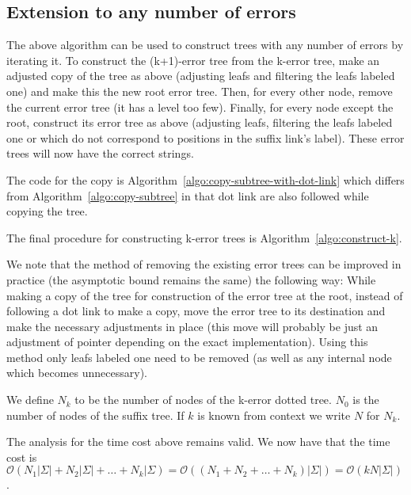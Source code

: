 \subsection{Extension to any number of errors}\label{subsec:construct-k-larger-1}

The above algorithm can be used to construct trees with any number of errors by iterating it. To construct the (k+1)-error tree from the k-error tree, make an adjusted copy of the tree as above (adjusting leafs and filtering the leafs labeled one) and make this the new root error tree. Then, for every other node, remove the current error tree (it has a level too few). Finally, for every node except the root, construct its error tree as above (adjusting leafs, filtering the leafs labeled one or which do not correspond to positions in the suffix link's label). These error trees will now have the correct strings.




The code for the copy is Algorithm~\ref{algo:copy-subtree-with-dot-link} which differs from Algorithm~\ref{algo:copy-subtree} in that dot link are also followed while copying the tree.

The final procedure for constructing k-error trees is Algorithm~\ref{algo:construct-k}.

We note that the method of removing the existing error trees can be improved in practice (the asymptotic bound remains the same) the following way: While making a copy of the tree for construction of the error tree at the root, instead of following a dot link to make a copy, move the error tree to its destination and make the necessary adjustments in place (this move will probably be just an adjustment of pointer depending on the exact implementation). Using this method only leafs labeled one need to be removed (as well as any internal node which becomes unnecessary).

\begin{definition}
We define $N_k$ to be the number of nodes of the k-error dotted tree. $N_0$ is the number of nodes of the suffix tree. If $k$ is known from context we write $N$ for $N_k$.
\end{definition}

The analysis for the time cost above remains valid. We now have that the time cost is $\mathcal{O}(N_1|\Sigma|+N_2|\Sigma|+\dots+N_k|\Sigma)=\mathcal{O}((N_1+N_2+\dots+N_k)|\Sigma|)=\mathcal{O}(kN|\Sigma|)$.

